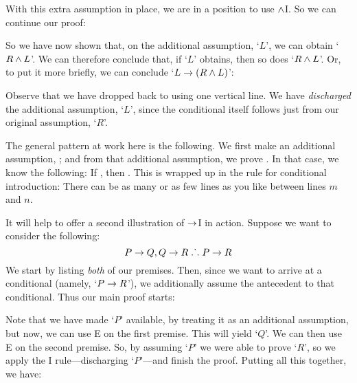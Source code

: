 With this extra assumption in place, we are in a position to use $\wedge$I. So we can continue our proof:
	\begin{pf}
		\open
	\end{pf}
So we have now shown that, on the additional assumption, `$L$', we can obtain `$R \wedge L$'. We can therefore conclude that, if `$L$' obtains, then so does `$R \wedge L$'. Or, to put it more briefly, we can conclude `$L \rightarrow (R \wedge L)$':
	\begin{pf}
		\hypo{r}{R}
		\open
			\hypo{l}{L}
			\ai{r, l}
			\close
		\ci{l-rl}
	\end{pf}
Observe that we have dropped back to using one vertical line.  We have \emph{discharged} the additional assumption, `$L$', since the conditional itself follows just from our original assumption, `$R$'.

The general pattern at work here is the following. We first make an additional assumption, \metaX; and from that additional assumption, we prove \metaY. In that case, we know the following: If \metaX, then \metaY. This is wrapped up in the rule for conditional introduction:
\factoidbox{
	\begin{pf}
	\open
		\hypo[m]{a}{\metaX}
		\ellipsesline
		\have[n]{b}{\metaY}
	\close
	\have[\ ]{ab}{\metaX\eif\metaY}\ci{a-b}
	\end{pf}}
There can be as many or as few lines as you like between lines $m$ and $n$. 

It will help to offer a second  illustration of $\rightarrow$I in action. Suppose we want to consider the following:
	$$P \rightarrow Q, Q \rightarrow R \mathrel{\ldotp\dot{}\,\ldotp} P \rightarrow R$$
We start by listing \emph{both} of our premises. Then, since we want to arrive at a conditional (namely, `$P \rightarrow R$'), we additionally assume the antecedent to that conditional. Thus our main proof starts:
\begin{pf}
	\hypo{pq}{P \eif Q}
	\hypo{qr}{Q \eif R}
	\open
		\hypo{p}{P}
	\close
\end{pf}
Note that we have made `$P$' available, by treating it as an additional assumption, but now, we can use {\eif}E on the first premise. This will yield `$Q$'. We can then use {\eif}E on the second premise. So, by assuming `$P$' we were able to prove `$R$', so we apply the {\eif}I rule---discharging `$P$'---and finish the proof. Putting all this together, we have:
\label{HSproof}
\begin{pf}
	\open
		\ce{pq,p}
		\ce{qr,q}
	\close
\end{pf}


